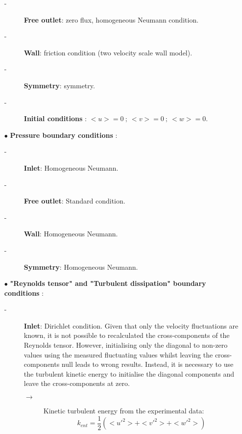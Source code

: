 \begin{itemize}
\begin{description}
\item[-]\textbf{Free outlet}: zero flux, homogeneous Neumann condition.

\item[-]\textbf{Wall}: friction condition (two velocity scale wall model).

\item[-]\textbf{Symmetry}: symmetry.

\item[-]\textbf{Initial conditions} : $<u>=0~;~<v>=0~;~<w>=0$.

\end{description}

\item[$\bullet$] \textbf{Pressure boundary conditions} :
\begin{description}
   \item[-]\textbf{Inlet}: Homogeneous Neumann.
   \item[-]\textbf{Free outlet}: Standard condition.
   \item[-]\textbf{Wall}: Homogeneous Neumann.
   \item[-]\textbf{Symmetry}: Homogeneous Neumann.
\end{description}

\item[$\bullet$] \textbf{"Reynolds tensor" and "Turbulent dissipation" boundary conditions} :

\begin{description}
   \item[-]\textbf{Inlet}: Dirichlet condition. Given that only the velocity fluctuations are known, it is not possible to recalculated the cross-components of the Reynolds tensor. However, initialising only the diagonal to non-zero values using the measured fluctuating values whilst leaving the cross-components null leads to wrong results. Instead, it is necessary to use the turbulent kinetic energy to initialise the diagonal components and leave the cross-components at zero.

         \begin{description}

            \item[$\rightarrow$] Kinetic turbulent energy from the experimental data:
                  \begin{displaymath}
                     k_{ent} = \frac{1}{2} \left( <{u'}^2> + <{v'}^2> + <{w'}^2> \right)
                  \end{displaymath}


\end{description}
\end{description}
\end{itemize}
